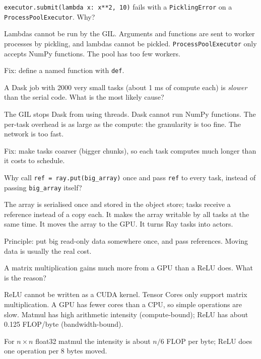 \documentclass[addpoints,11pt]{exam}
\newcommand{\q}{\Needspace{7\baselineskip}\question}
\begin{document}
\begin{questions}
\q[4]
\texttt{executor.submit(lambda x: x**2, 10)} fails with a \texttt{PicklingError} on a
\texttt{ProcessPoolExecutor}. Why?
\begin{choices}
  \choice Lambdas cannot be run by the GIL.
  \CorrectChoice Arguments and functions are sent to worker processes by pickling, and lambdas cannot be pickled.
  \choice \texttt{ProcessPoolExecutor} only accepts NumPy functions.
  \choice The pool has too few workers.
\end{choices}
\begin{solution}Fix: define a named function with \texttt{def}.\end{solution}

\q[4]
A Dask job with 2000 very small tasks (about 1 ms of compute each) is \emph{slower} than the serial
code. What is the most likely cause?
\begin{choices}
  \choice The GIL stops Dask from using threads.
  \choice Dask cannot run NumPy functions.
  \CorrectChoice The per-task overhead is as large as the compute: the granularity is too fine.
  \choice The network is too fast.
\end{choices}
\begin{solution}Fix: make tasks coarser (bigger chunks), so each task computes much longer than it costs to schedule.\end{solution}

\q[4]
Why call \texttt{ref = ray.put(big\_array)} once and pass \texttt{ref} to every task, instead of
passing \texttt{big\_array} itself?
\begin{choices}
  \CorrectChoice The array is serialised once and stored in the object store; tasks receive a reference instead of a copy each.
  \choice It makes the array writable by all tasks at the same time.
  \choice It moves the array to the GPU.
  \choice It turns Ray tasks into actors.
\end{choices}
\begin{solution}Principle: put big read-only data somewhere once, and pass references. Moving data is usually the real cost.\end{solution}

\q[4]
A matrix multiplication gains much more from a GPU than a ReLU does. What is the reason?
\begin{choices}
  \choice ReLU cannot be written as a CUDA kernel.
  \choice Tensor Cores only support matrix multiplication.
  \choice A GPU has fewer cores than a CPU, so simple operations are slow.
  \CorrectChoice Matmul has high arithmetic intensity (compute-bound); ReLU has about 0.125 FLOP/byte (bandwidth-bound).
\end{choices}
\begin{solution}For $n\times n$ float32 matmul the intensity is about $n/6$ FLOP per byte; ReLU does one operation per 8 bytes moved.\end{solution}


\end{questions}
\end{document}
